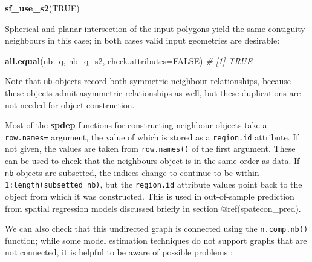 \documentclass[]{book}
\newenvironment{Shaded}{\begin{snugshade}}{\end{snugshade}}
\newcommand{\CommentTok}[1]{\textcolor[rgb]{0.56,0.35,0.01}{\textit{#1}}}
\newcommand{\DataTypeTok}[1]{\textcolor[rgb]{0.13,0.29,0.53}{#1}}
\newcommand{\KeywordTok}[1]{\textcolor[rgb]{0.13,0.29,0.53}{\textbf{#1}}}
\newcommand{\NormalTok}[1]{#1}
\newcommand{\OperatorTok}[1]{\textcolor[rgb]{0.81,0.36,0.00}{\textbf{#1}}}
\newcommand{\OtherTok}[1]{\textcolor[rgb]{0.56,0.35,0.01}{#1}}
\newcommand{\StringTok}[1]{\textcolor[rgb]{0.31,0.60,0.02}{#1}}
\begin{document}
\begin{Shaded}
\begin{Highlighting}[]
\KeywordTok{sf_use_s2}\NormalTok{(}\OtherTok{TRUE}\NormalTok{)}
\end{Highlighting}
\end{Shaded}

\begin{Shaded}
\end{Shaded}

Spherical and planar intersection of the input polygons yield the same contiguity neighbours in this case; in both cases valid input geometries are desirable:

\begin{Shaded}
\begin{Highlighting}[]
\KeywordTok{all.equal}\NormalTok{(nb_q, nb_q_s2, }\DataTypeTok{check.attributes=}\OtherTok{FALSE}\NormalTok{)}
\CommentTok{# [1] TRUE}
\end{Highlighting}
\end{Shaded}

Note that \texttt{nb} objects record both symmetric neighbour relationships, because these objects admit asymmetric relationships as well, but these duplications are not needed for object construction.

Most of the \textbf{spdep} functions for constructing neighbour objects take a \texttt{row.names=} argument, the value of which is stored as a \texttt{region.id} attribute. If not given, the values are taken from \texttt{row.names()} of the first argument. These can be used to check that the neighbours object is in the same order as data. If \texttt{nb} objects are subsetted, the indices change to continue to be within \texttt{1:length(subsetted\_nb)}, but the \texttt{region.id} attribute values point back to the object from which it was constructed. This is used in out-of-sample prediction from spatial regression models discussed briefly in section @ref(spatecon\_pred).

We can also check that this undirected graph is connected using the \texttt{n.comp.nb()} function; while some model estimation techniques do not support graphs that are not connected, it is helpful to be aware of possible problems \citep{FRENISTERRANTINO201825}:
\end{document}
